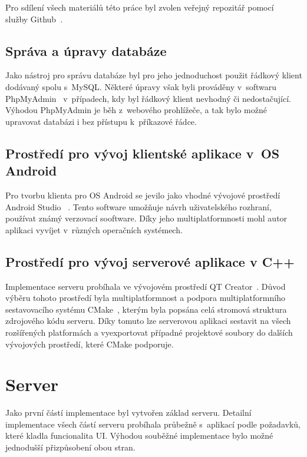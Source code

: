 \documentclass[thesis=B,czech]{FITthesis}[2013/10/20]
\begin{document}
Pro sdílení všech materiálů této práce byl zvolen veřejný repozitář pomocí~\cite{repo} služby Github~\cite{github}.

\subsection{Správa a úpravy databáze}

Jako nástroj pro správu databáze byl pro jeho jednoduchost použit řádkový klient dodávaný spolu s~MySQL. Některé úpravy však byli prováděny v~softwaru PhpMyAdmin~\cite{phpmyadmin} v~případech, kdy byl řádkový klient nevhodný či nedostačující. Výhodou PhpMyAdmin je běh z~webového prohlížeče, a tak bylo možné upravovat databázi i bez přístupu k~příkazové řádce.

\subsection{Prostředí pro vývoj klientské aplikace v~OS Android}

Pro tvorbu klienta pro OS Android se jevilo jako vhodné vývojové prostředí Android Studio ~\cite{android_studio}. Tento software umožňuje návrh uživatelského rozhraní, používat známý verzovací sooftware. Díky jeho multiplatformnosti mohl autor aplikaci vyvíjet v~různých operačních systémech.

\subsection{Prostředí pro vývoj serverové aplikace v C++}

Implementace serveru probíhala ve vývojovém prostředí QT Creator~\cite{qtcreator}. Důvod výběru tohoto prostředí byla multiplatformnost a podpora multiplatformního sestavovacího systému CMake~\cite{cmake}, kterým byla popsána celá stromová struktura zdrojového kódu serveru. Díky tomuto lze serverovou aplikaci sestavit na všech rozšířených platformách a vyexportovat případné projektové soubory do dalších vývojových prostředí, které CMake podporuje.

\section{Server}

Jako první částí implementace byl vytvořen základ serveru. Detailní implementace všech částí serveru probíhala průbežně s~aplikací podle požadavků, které kladla funcionalita UI. Výhodou souběžné implementace bylo možné jednodušší přizpůsobení obou stran.
\end{document}
